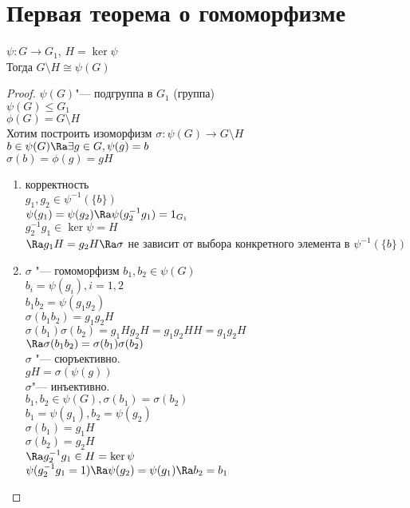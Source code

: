 ﻿\section{Первая теорема о гомоморфизме}
\begin{theorem}
$\psi \colon G \to G_1$, $H = \ker \psi$\\
Тогда $G \setminus H \cong \psi(G)$\\
\end{theorem}
\begin{proof}
$\psi(G)$"--- подгруппа в $G_1$ (группа)\\
$\psi(G) \le G_1$\\
$\phi(G) = G \setminus H$\\
Хотим построить изоморфизм $\sigma\colon \psi(G) \to G \setminus H$\\

$b \in \psi(G) \Ra \exists g \in G, \psi(g) = b$\\
$\sigma(b) = \phi(g) = gH$\\
\begin{enumerate}
\item корректность\\
$g_1, g_2 \in \psi^{-1}(\{b\})$\\
$\psi(g_1) = \psi(g_2) \Ra \psi(g_2^{-1}g_1) = 1_{G_1}$\\
$g_2^{-1}g_1 \in \ker\psi = H$\\
$\Ra g_1H = g_2H \Ra \sigma$ не зависит от выбора конкретного элемента в $\psi^{-1}(\{b\})$\\
\item $\sigma$ "--- гомоморфизм
$b_1, b_2 \in \psi(G)$ \\
$b_i = \psi(g_i), i = 1,2$\\
$b_1b_2 = \psi(g_1g_2)$\\
$\sigma(b_1b_2) = g_1g_2H$\\
$\sigma(b_1)\sigma(b_2) = g_1Hg_2H = g_1g_2HH = g_1g_2H$\\
$\Ra \sigma(b_1b_2) = \sigma(b_1)\sigma(b_2)$\\
$\sigma$ "--- сюръективно.\\
$gH = \sigma(\psi(g))$\\
$\sigma$"--- инъективно.\\
$b_1, b_2 \in \psi(G), \sigma(b_1) = \sigma(b_2)$\\
$b_1 = \psi(g_1), b_2 = \psi(g_2)$\\
$\sigma(b_1) = g_1H$\\
$\sigma(b_2) = g_2H$\\
$\Ra g_2^{-1}g_1 \in H = \ker \psi$\\
$\psi(g_2^{-1}g_1 = 1) \Ra \psi(g_2) = \psi(g_1) \Ra b_2 = b_1$\\
\end{enumerate}
\end{proof}
